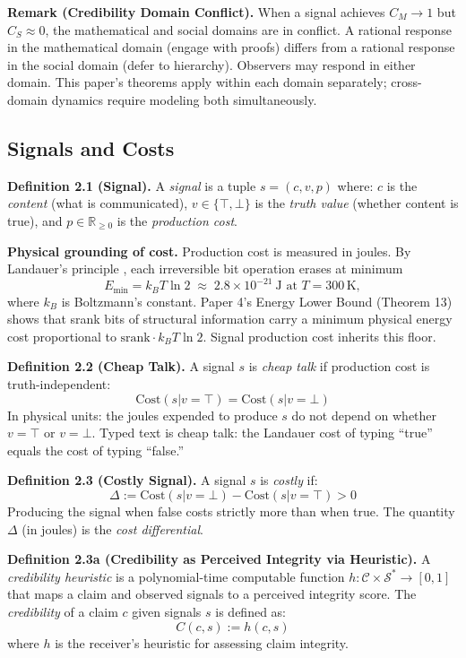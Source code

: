 \textbf{Remark (Credibility Domain Conflict).} When a signal achieves $C_M \to 1$ but $C_S \approx 0$, the mathematical and social domains are in conflict. A rational response in the mathematical domain (engage with proofs) differs from a rational response in the social domain (defer to hierarchy). Observers may respond in either domain. This paper's theorems apply within each domain separately; cross-domain dynamics require modeling both simultaneously.

\subsection{Signals and Costs}\label{signals-and-costs}

\textbf{Definition 2.1 (Signal).} A \emph{signal} is a tuple
\(s = (c, v, p)\) where: \(c\) is the \emph{content} (what is
communicated), \(v \in \{\top, \bot\}\) is the \emph{truth value}
(whether content is true), and \(p \in \mathbb{R}_{\geq 0}\) is the
\emph{production cost}.

\textbf{Physical grounding of cost.}
Production cost is measured in joules. By Landauer's principle \cite{landauer1961}, each
irreversible bit operation erases at minimum
\[
E_{\min} = k_B T \ln 2 \;\approx\; 2.8 \times 10^{-21}~\text{J at } T = 300\,\text{K},
\]
where $k_B$ is Boltzmann's constant. Paper 4's Energy Lower Bound (Theorem 13) shows that
srank bits of structural information carry a minimum physical energy cost
proportional to $\text{srank} \cdot k_B T \ln 2$. Signal production cost inherits this floor.

\textbf{Definition 2.2 (Cheap Talk).} A signal \(s\) is \emph{cheap
talk} if production cost is truth-independent:
\[\text{Cost}(s | v = \top) = \text{Cost}(s | v = \bot)\]
In physical units: the joules expended to produce $s$ do not depend on whether $v = \top$ or $v = \bot$.
Typed text is cheap talk: the Landauer cost of typing ``true'' equals the cost of typing ``false.''

\textbf{Definition 2.3 (Costly Signal).} A signal \(s\) is \emph{costly}
if:
\[\Delta := \text{Cost}(s | v = \bot) - \text{Cost}(s | v = \top) > 0\]
Producing the signal when false costs strictly more than when true. The quantity $\Delta$
(in joules) is the \emph{cost differential}.

\textbf{Definition 2.3a (Credibility as Perceived Integrity via Heuristic).}
A \emph{credibility heuristic} is a polynomial-time computable function 
$h : \mathcal{C} \times \mathcal{S}^* \to [0,1]$ that maps a claim and observed 
signals to a perceived integrity score. The \emph{credibility} of a claim $c$ given 
signals $s$ is defined as:
\[C(c, s) := h(c, s)\]
where $h$ is the receiver's heuristic for assessing claim integrity.

